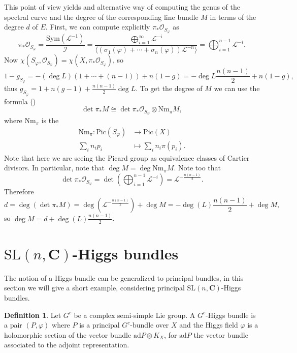 \documentclass[12pt,a4paper]{book}
\theoremstyle{definition} \newtheorem{defn}[thm]{Definition}
\theoremstyle{definition} \newtheorem{ejemplo}[thm]{Example}
\theoremstyle{remark} \newtheorem{rem}[thm]{Remark}
\def\OO{\mathscr{O}}
\def\LL{\mathscr{L}}
\def\II{\mathscr{I}}
\def\CC{\mathbf{C}}
\def\ad{\mathrm{ad}}
\def\Nm{\mathrm{Nm}}
\def\SL{\mathrm{SL}}
\def\Sym{\mathrm{Sym}}
\def\Pic{\mathrm{Pic}}
\let\emph\relax
\begin{document}
  This point of view yields and alternative way of computing the genus of the spectral curve and the degree of the corresponding line bundle $M$ in terms of the degree $d$ of $E$. First, we can compute explicitly $\pi_*\OO_{S_\varphi}$ as
  \begin{equation*}
    \pi_*\OO_{S_\varphi}=\frac{\Sym(\LL^{-1})}{\II}=\frac{\bigoplus_{i=1}^\infty \LL^{-i}}{\langle(\sigma_1(\varphi)+\cdots+\sigma_n(\varphi))\LL^{-n}\rangle}=\bigoplus_{i=1}^{n-1} \LL^{-i}.
  \end{equation*}
  Now $\chi(S_\varphi,\OO_{S_\varphi})=\chi(X,\pi_*\OO_{S_\varphi})$, so 
  \begin{equation*}
    1-g_{S_{\varphi}}=-(\deg L)(1+\cdots+(n-1))+n(1-g)=-\deg L\frac{n(n-1)}{2}+n(1-g),
  \end{equation*}
  thus $g_{S_{\varphi}}=1+n(g-1)+\frac{n(n-1)}{2}\deg L$. To get the degree of $M$ we can use the formula (\cite[Ex. IV.2.6(a)]{hartshorne})
  \begin{equation*}
    \det \pi_*M \cong \det \pi_*\OO_{S_\varphi} \otimes \Nm_\pi M,
  \end{equation*}
  where $\Nm_\pi$ is the \emph{norm map}
  \begin{align*}
    \Nm_\pi :\Pic(S_{\varphi})&\longrightarrow \Pic(X)\\ 
    \sum_{i} n_ip_i &\longmapsto \sum_i n_i \pi(p_i). 
    \end{align*}
    Note that here we are seeing the Picard group as equivalence classes of Cartier divisors. In particular, note that $\deg M = \deg \Nm_\pi M$. Note too that
    \begin{equation*}
      \det \pi_* \OO_{S_\varphi} = \det\left( \bigoplus_{i=1}^{n-1} \LL^{-i}\right) = \LL^{-\frac{n(n-1)}{2}}.
    \end{equation*}
    Therefore
    \begin{equation*}
      d=\deg(\det \pi_*M)=\deg\left( \LL^{-\frac{n(n-1)}{2}} \right)+ \deg M= -\deg(L)\frac{n(n-1)}{2} + \deg M ,
    \end{equation*}
    so $\deg M = d+\deg(L)\frac{n(n-1)}{2}$.
	  
\section{$\SL(n,\CC)$-Higgs bundles}
The notion of a Higgs bundle can be generalized to principal bundles, in this section we will give a short example, considering principal $\SL(n,\CC)$-Higgs bundles.

\begin{defn}
  Let $G^c$ be a complex semi-simple Lie group. A $G^c$-Higgs bundle is a pair $(P,\varphi)$ where $P$ is a principal $G^c$-bundle over $X$ and the Higgs field $\varphi$ is a holomorphic section of the vector bundle $\ad P \otimes K_X$, for $\ad P$ the vector bundle associated to the adjoint representation.
\end{defn}
\end{document}
